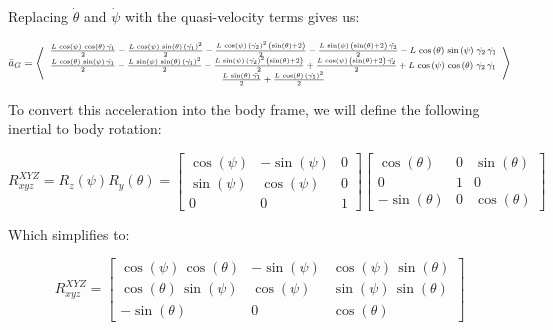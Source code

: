 \documentclass[12pt, letterpaper]{../assignment}
\begin{document}
Replacing $\dot{\theta}$ and $\dot{\psi}$ with the quasi-velocity terms gives us:

$$ \bar{a}_G = {\footnotesize\left<\begin{array}{c}
  \frac{L\,\cos\left(\psi \right)\,\cos\left(\theta \right)\,\ddot{\gamma_1}}{2}-\frac{L\,\cos\left(\psi \right)\,\sin\left(\theta \right)\,{\left(\dot{\gamma_1}\right)}^2}{2}-\frac{L\,\cos\left(\psi \right)\,{\left(\dot{\gamma_2}\right)}^2\,\left(\sin\left(\theta \right)+2\right)}{2}-\frac{L\,\sin\left(\psi \right)\,\left(\sin\left(\theta \right)+2\right)\,\ddot{\gamma_2}}{2}-L\,\cos\left(\theta \right)\,\sin\left(\psi \right)\,\dot{\gamma_2}\,\dot{\gamma_1}\\
  \frac{L\,\cos\left(\theta \right)\,\sin\left(\psi \right)\,\ddot{\gamma_1}}{2}-\frac{L\,\sin\left(\psi \right)\,\sin\left(\theta \right)\,{\left(\dot{\gamma_1}\right)}^2}{2}-\frac{L\,\sin\left(\psi \right)\,{\left(\dot{\gamma_2}\right)}^2\,\left(\sin\left(\theta \right)+2\right)}{2}+\frac{L\,\cos\left(\psi \right)\,\left(\sin\left(\theta \right)+2\right)\,\ddot{\gamma_2}}{2}+L\,\cos\left(\psi \right)\,\cos\left(\theta \right)\,\dot{\gamma_2}\,\dot{\gamma_1}\\
  \frac{L\,\sin\left(\theta \right)\,\ddot{\gamma_1}}{2}+\frac{L\,\cos\left(\theta \right)\,{\left(\dot{\gamma_1}\right)}^2}{2} \end{array}\right>}$$


To convert this acceleration into the body frame, we will define the following inertial to body rotation:

$$ R_{xyz}^{XYZ} = R_z(\psi) R_y(\theta) = 
\left[\begin{array}{ccc} \cos\left(\psi \right) & -\sin\left(\psi \right) & 0\\ \sin\left(\psi \right) & \cos\left(\psi \right) & 0\\ 0 & 0 & 1 \end{array}\right]
\left[\begin{array}{ccc} \cos\left(\theta \right) & 0 & \sin\left(\theta \right)\\ 0 & 1 & 0\\ -\sin\left(\theta \right) & 0 & \cos\left(\theta \right) \end{array}\right]$$

Which simplifies to:

$$ R_{xyz}^{XYZ} = \left[\begin{array}{ccc} \cos\left(\psi \right)\,\cos\left(\theta \right) & -\sin\left(\psi \right) & \cos\left(\psi \right)\,\sin\left(\theta \right)\\ \cos\left(\theta \right)\,\sin\left(\psi \right) & \cos\left(\psi \right) & \sin\left(\psi \right)\,\sin\left(\theta \right)\\ -\sin\left(\theta \right) & 0 & \cos\left(\theta \right) \end{array}\right] $$
\end{document}
